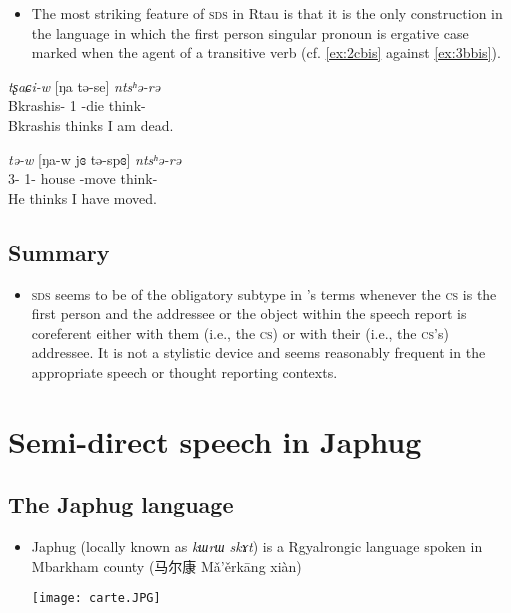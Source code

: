 \documentclass[11pt]{article}
\newcommand{\zh}[1]{{\cn #1}}
\newcommand{\ipa}[1]{{\textit{\phon #1}}} %
\newcommand{\ipapl}[1]{{\phondroit #1}}
\begin{document}
\begin{itemize}
 \item  The most striking feature of \textsc{sds} in Rtau is that it is the only construction in the language in which the first person singular pronoun is ergative case marked when the agent of a transitive verb (cf. \ref{ex:2cbis} against \ref{ex:3bbis}).
\end{itemize}

\begin{exe}

\ex \label{ex:2cbis}
\gll
	\ipa{tʂaɕi-w} [\ipapl{ŋa} \ipapl{tə-se}] \ipa{ntsʰə-rə}  \\
	{Bkrashis-\erg} {1\sg} {\prf-die} {think-\const}\\ 
	\glt Bkrashis thinks I am dead.

\ex \label{ex:3bbis}
\gll
	 \ipa{tə-w} [\ipapl{ŋa-w} \ipapl{jɞ} \ipapl{tə-spɞ}] \ipa{ntsʰə-rə}  \\
	  {3\sg-\erg} {1\sg-\erg} house {\prf-move} {think-\const}\\ 
	\glt He thinks I have moved.
\end{exe}




 \subsection{Summary}

\begin{itemize}
 \item \textsc{sds} seems to be of the obligatory subtype in \cite{aikhenvald08semidirect}'s terms whenever the \textsc{cs} is the first person and the addressee or the object within the speech report is coreferent either with them (i.e., the \textsc{cs}) or with their (i.e., the \textsc{cs}'s) addressee. It is not a stylistic device and seems reasonably frequent in the appropriate speech or thought reporting contexts.
\end{itemize}



\section{Semi-direct  speech in Japhug} 


\subsection{The Japhug language}


\begin{itemize}
 \item  Japhug (locally known as \ipa{kɯrɯ skɤt}) is a Rgyalrongic language spoken in Mbarkham county (\zh{马尔康} Mǎ'ěrkāng xiàn) 

\texttt{[image: carte.JPG]}

\end{itemize}
\end{document}
